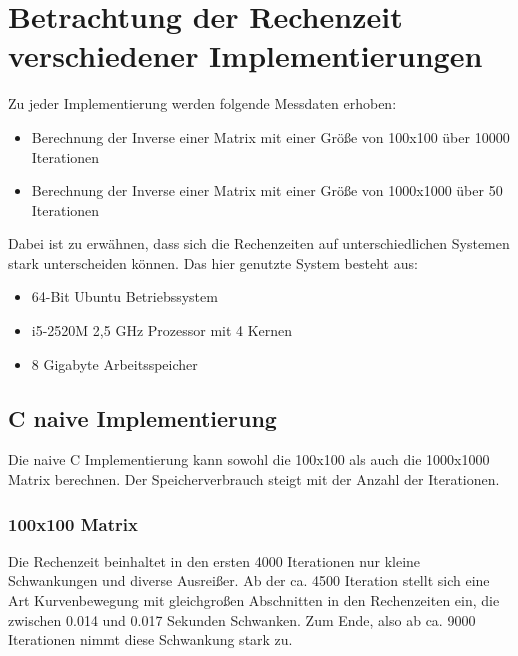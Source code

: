 %

\chapter{Betrachtung der Rechenzeit verschiedener Implementierungen}

Zu jeder Implementierung werden folgende Messdaten erhoben:
\begin{itemize}
	\item Berechnung der Inverse einer Matrix mit einer Größe von 100x100 über 10000 Iterationen
	\item Berechnung der Inverse einer Matrix mit einer Größe von 1000x1000 über 50 Iterationen
\end{itemize}

Dabei ist zu erwähnen, dass sich die Rechenzeiten auf unterschiedlichen Systemen stark unterscheiden können.
Das hier genutzte System besteht aus:
\begin{itemize}
	\item 64-Bit Ubuntu Betriebssystem
	\item i5-2520M 2,5 GHz Prozessor mit 4 Kernen
	\item 8 Gigabyte Arbeitsspeicher
\end{itemize}
\section{C naive Implementierung}
Die naive C Implementierung kann sowohl die 100x100 als auch die 1000x1000 Matrix berechnen. Der Speicherverbrauch steigt mit der Anzahl der Iterationen.
\subsection{100x100 Matrix}

Die Rechenzeit beinhaltet in den ersten 4000 Iterationen nur kleine Schwankungen und diverse Ausreißer. Ab der ca. 4500 Iteration stellt sich eine Art Kurvenbewegung mit gleichgroßen Abschnitten in den Rechenzeiten ein, die zwischen 0.014 und 0.017 Sekunden Schwanken. Zum Ende, also ab ca. 9000 Iterationen  nimmt diese Schwankung stark zu.

